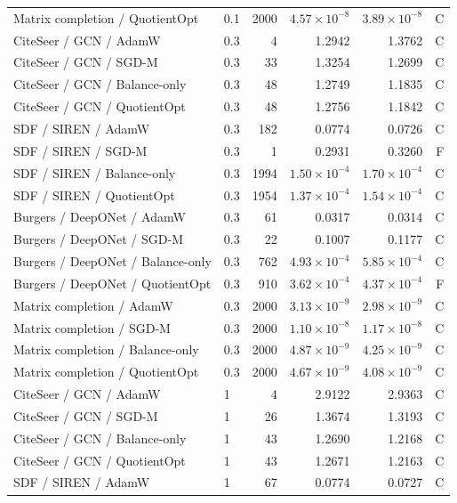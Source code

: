 \begin{longtable}{p{.34\linewidth}p{.09\linewidth}rrrr}
\rowcolor{oursbg}Matrix completion / QuotientOpt & 0.1 & 2000 & $4.57\!\times\!10^{-8}$ & $3.89\!\times\!10^{-8}$ & C\\
CiteSeer / GCN / AdamW & 0.3 & 4 & 1.2942 & 1.3762 & C\\
CiteSeer / GCN / SGD-M & 0.3 & 33 & 1.3254 & 1.2699 & C\\
CiteSeer / GCN / Balance-only & 0.3 & 48 & 1.2749 & 1.1835 & C\\
\rowcolor{oursbg}CiteSeer / GCN / QuotientOpt & 0.3 & 48 & 1.2756 & 1.1842 & C\\
SDF / SIREN / AdamW & 0.3 & 182 & 0.0774 & 0.0726 & C\\
SDF / SIREN / SGD-M & 0.3 & 1 & 0.2931 & 0.3260 & F\\
SDF / SIREN / Balance-only & 0.3 & 1994 & $1.50\!\times\!10^{-4}$ & $1.70\!\times\!10^{-4}$ & C\\
\rowcolor{oursbg}SDF / SIREN / QuotientOpt & 0.3 & 1954 & $1.37\!\times\!10^{-4}$ & $1.54\!\times\!10^{-4}$ & C\\
Burgers / DeepONet / AdamW & 0.3 & 61 & 0.0317 & 0.0314 & C\\
Burgers / DeepONet / SGD-M & 0.3 & 22 & 0.1007 & 0.1177 & C\\
Burgers / DeepONet / Balance-only & 0.3 & 762 & $4.93\!\times\!10^{-4}$ & $5.85\!\times\!10^{-4}$ & C\\
\rowcolor{oursbg}Burgers / DeepONet / QuotientOpt & 0.3 & 910 & $3.62\!\times\!10^{-4}$ & $4.37\!\times\!10^{-4}$ & F\\
Matrix completion / AdamW & 0.3 & 2000 & $3.13\!\times\!10^{-9}$ & $2.98\!\times\!10^{-9}$ & C\\
Matrix completion / SGD-M & 0.3 & 2000 & $1.10\!\times\!10^{-8}$ & $1.17\!\times\!10^{-8}$ & C\\
Matrix completion / Balance-only & 0.3 & 2000 & $4.87\!\times\!10^{-9}$ & $4.25\!\times\!10^{-9}$ & C\\
\rowcolor{oursbg}Matrix completion / QuotientOpt & 0.3 & 2000 & $4.67\!\times\!10^{-9}$ & $4.08\!\times\!10^{-9}$ & C\\
CiteSeer / GCN / AdamW & 1 & 4 & 2.9122 & 2.9363 & C\\
CiteSeer / GCN / SGD-M & 1 & 26 & 1.3674 & 1.3193 & C\\
CiteSeer / GCN / Balance-only & 1 & 43 & 1.2690 & 1.2168 & C\\
\rowcolor{oursbg}CiteSeer / GCN / QuotientOpt & 1 & 43 & 1.2671 & 1.2163 & C\\
SDF / SIREN / AdamW & 1 & 67 & 0.0774 & 0.0727 & C\\

\end{longtable}
